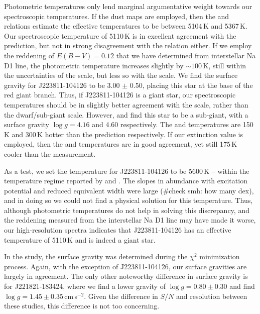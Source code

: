\documentclass{emulateapj}
\begin{document}
Photometric temperatures only lend marginal argumentative weight towards our spectroscopic temperatures. If the \citet{schlegel;et-al_1998} dust maps are employed, then the \citet{alonso;et-al_1999} and \citet{casagrande;et-al_2010} relations estimate the effective temperatures to be between 5104\,K and 5367\,K. Our spectroscopic temperature of 5110\,K is in excellent agreement with the \citet{alonso;et-al_1999} prediction, but not in strong disagreement with the \citet{casagrande;et-al_2010} relation either. If we employ the reddening of $E(B-V) = 0.12$ that we have determined from interstellar Na D1 line, the photometric temperature increases slightly by ${\sim}100$\,K, still within the uncertainties of the \citet{alonso;et-al_1999} scale, but less so with the \citet{casagrande;et-al_2010} scale. We find the surface gravity for J223811-104126 to be 3.00 $\pm$ 0.50, placing this star at the base of the red giant branch. Thus, if J223811-104126 is a giant star, our spectroscopic temperatures should be in slightly better agreement with the \citet{alonso;et-al_1999} scale, rather than the \citet{casagrande;et-al_2010} dwarf/sub-giant scale. However, \citet{williams;et-al_2011} and \citet{wylie-de-boer;et-al_2012} find this star to be a sub-giant, with a surface gravity $\log{g} = 4.16$ and 4.60 respectively. The \citet{williams;et-al_2011} and \citet{wylie-de-boer;et-al_2012} temperatures are 150\,K and 300\,K hotter than the \citet{casagrande;et-al_2010} prediction respectively. If our extinction value is employed, then the \citet{williams;et-al_2011} and \citet{casagrande;et-al_2010} temperatures are in good agreement, yet still 175\,K cooler than the \citet{wylie-de-boer;et-al_2012} measurement.

As a test, we set the temperature for J223811-104126 to be 5600\,K -- within the temperature regime reported by \citet{williams;et-al_2011} and \citet{wylie-de-boer;et-al_2012}. The slopes in abundance with excitation potential and reduced equivalent width were large (\#check smh: how many dex), and in doing so we could not find a physical solution for this temperature. Thus, although photometric temperatures do not help in solving this discrepancy, and the reddening measured from the interstellar Na D1 line may have made it worse, our high-resolution spectra indicates that J223811-104126 has an effective temperature of 5110\,K and is indeed a giant star.

In the \citet{wylie-de-boer;et-al_2012} study, the surface gravity was determined during the $\chi^2$ minimization process. Again, with the exception of J223811-104126, our surface gravities are largely in agreement. The only other noteworthy difference in surface gravity is for J221821-183424, where we find a lower gravity of $\log{g} = 0.80 \pm 0.30$ and \citet{wylie-de-boer;et-al_2012} find $\log{g} = 1.45 \pm 0.35$\,cm\,s$^{-2}$. Given the difference in $S/N$ and resolution between these studies, this difference is not too concerning. 
\end{document}
